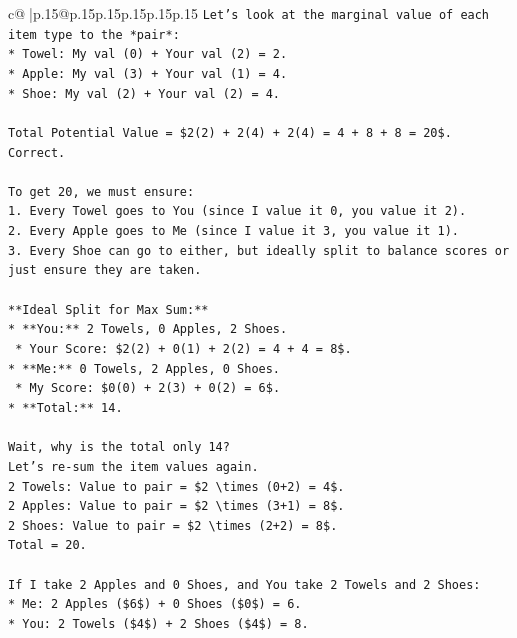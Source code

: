 \documentclass{article}
\begin{document}
{\begin{supertabular}{c@{$\;$}|p{.15\linewidth}@{}p{.15\linewidth}p{.15\linewidth}p{.15\linewidth}p{.15\linewidth}p{.15\linewidth}}
{{{\texttt{Let's look at the marginal value of each item type to the *pair*:} \\
\texttt{*   Towel: My val (0) + Your val (2) = 2.} \\
\texttt{*   Apple: My val (3) + Your val (1) = 4.} \\
\texttt{*   Shoe: My val (2) + Your val (2) = 4.} \\
\\ 
\texttt{Total Potential Value = \$2(2) + 2(4) + 2(4) = 4 + 8 + 8 = 20\$. Correct.} \\
\\ 
\texttt{To get 20, we must ensure:} \\
\texttt{1.  Every Towel goes to You (since I value it 0, you value it 2).} \\
\texttt{2.  Every Apple goes to Me (since I value it 3, you value it 1).} \\
\texttt{3.  Every Shoe can go to either, but ideally split to balance scores or just ensure they are taken.} \\
\\ 
\texttt{**Ideal Split for Max Sum:**} \\
\texttt{*   **You:** 2 Towels, 0 Apples, 2 Shoes.} \\
\texttt{    *   Your Score: \$2(2) + 0(1) + 2(2) = 4 + 4 = 8\$.} \\
\texttt{*   **Me:** 0 Towels, 2 Apples, 0 Shoes.} \\
\texttt{    *   My Score: \$0(0) + 2(3) + 0(2) = 6\$.} \\
\texttt{*   **Total:** 14.} \\
\\ 
\texttt{Wait, why is the total only 14?} \\
\texttt{Let's re{-}sum the item values again.} \\
\texttt{2 Towels: Value to pair = \$2 \textbackslash{}times (0+2) = 4\$.} \\
\texttt{2 Apples: Value to pair = \$2 \textbackslash{}times (3+1) = 8\$.} \\
\texttt{2 Shoes: Value to pair = \$2 \textbackslash{}times (2+2) = 8\$.} \\
\texttt{Total = 20.} \\
\\ 
\texttt{If I take 2 Apples and 0 Shoes, and You take 2 Towels and 2 Shoes:} \\
\texttt{*   Me: 2 Apples (\$6\$) + 0 Shoes (\$0\$) = 6.} \\
\texttt{*   You: 2 Towels (\$4\$) + 2 Shoes (\$4\$) = 8.} \\
}}}
\end{supertabular}}
\end{document}
